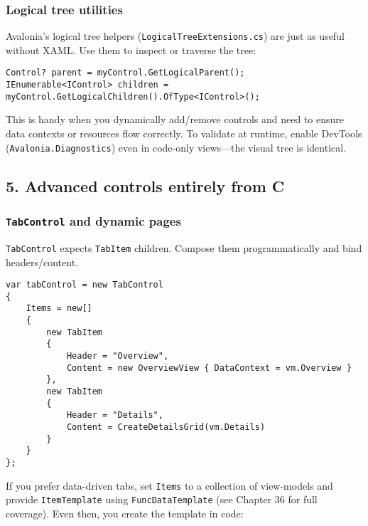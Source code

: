 \subsubsection{Logical tree utilities}\label{logical-tree-utilities}

Avalonia's logical tree helpers
(\passthrough{\lstinline!LogicalTreeExtensions.cs!}) are just as useful
without XAML. Use them to inspect or traverse the tree:

\begin{lstlisting}
Control? parent = myControl.GetLogicalParent();
IEnumerable<IControl> children = myControl.GetLogicalChildren().OfType<IControl>();
\end{lstlisting}

This is handy when you dynamically add/remove controls and need to
ensure data contexts or resources flow correctly. To validate at
runtime, enable DevTools
(\passthrough{\lstinline!Avalonia.Diagnostics!}) even in code-only
views---the visual tree is identical.

\subsection{5. Advanced controls entirely from
C}\label{advanced-controls-entirely-from-c}

\subsubsection{\texorpdfstring{\texttt{TabControl} and dynamic
pages}{TabControl and dynamic pages}}\label{tabcontrol-and-dynamic-pages}

\passthrough{\lstinline!TabControl!} expects
\passthrough{\lstinline!TabItem!} children. Compose them
programmatically and bind headers/content.

\begin{lstlisting}
var tabControl = new TabControl
{
    Items = new[]
    {
        new TabItem
        {
            Header = "Overview",
            Content = new OverviewView { DataContext = vm.Overview }
        },
        new TabItem
        {
            Header = "Details",
            Content = CreateDetailsGrid(vm.Details)
        }
    }
};
\end{lstlisting}

If you prefer data-driven tabs, set \passthrough{\lstinline!Items!} to a
collection of view-models and provide
\passthrough{\lstinline!ItemTemplate!} using
\passthrough{\lstinline!FuncDataTemplate!} (see Chapter 36 for full
coverage). Even then, you create the template in code:

